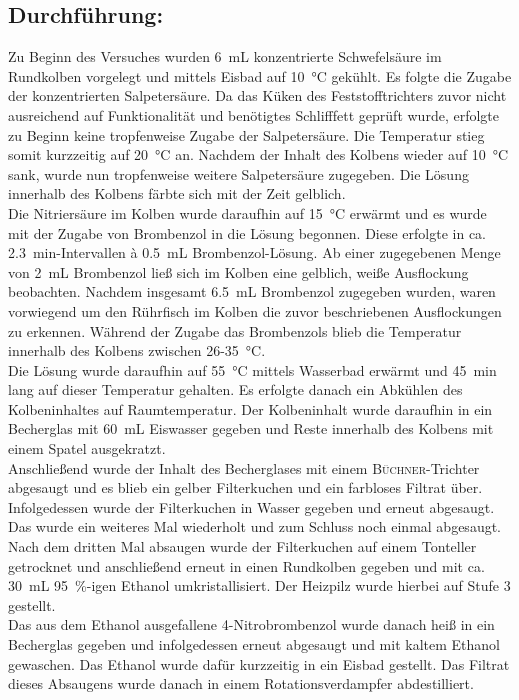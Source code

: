 \subsection*{Durchführung:}
Zu Beginn des Versuches wurden \SI{6}{\milli \liter} konzentrierte Schwefelsäure im Rundkolben vorgelegt und mittels Eisbad auf \SI{10}{\celsius} gekühlt. Es folgte die Zugabe der konzentrierten Salpetersäure. Da das Küken des Feststofftrichters zuvor nicht ausreichend auf Funktionalität und benötigtes Schlifffett geprüft wurde, erfolgte zu Beginn keine tropfenweise Zugabe der Salpetersäure. Die Temperatur stieg somit kurzzeitig auf \SI{20}{\celsius} an. Nachdem der Inhalt des Kolbens wieder auf \SI{10}{\celsius} sank, wurde nun tropfenweise weitere Salpetersäure zugegeben. Die Lösung innerhalb des Kolbens färbte sich mit der Zeit gelblich. \\
Die Nitriersäure im Kolben wurde daraufhin auf \SI{15}{\celsius} erwärmt und es wurde mit der Zugabe von Brombenzol in die Lösung begonnen. Diese erfolgte in ca. \SI{2,3}{\minute}-Intervallen à \SI{0,5}{\milli \liter} Brombenzol-Lösung. Ab einer zugegebenen Menge von \SI{2}{\milli \liter} Brombenzol ließ sich im Kolben eine gelblich, weiße Ausflockung beobachten. Nachdem insgesamt \SI{6,5}{\milli \liter} Brombenzol zugegeben wurden, waren vorwiegend um den Rührfisch im Kolben die zuvor beschriebenen Ausflockungen zu erkennen. Während der Zugabe das Brombenzols blieb die Temperatur innerhalb des Kolbens zwischen 26-\SI{35}{\celsius}.\\
Die Lösung wurde daraufhin auf \SI{55}{\celsius}  mittels Wasserbad erwärmt und \SI{45}{\minute} lang auf dieser Temperatur gehalten. Es erfolgte danach ein Abkühlen des Kolbeninhaltes auf Raumtemperatur. Der Kolbeninhalt wurde daraufhin in ein Becherglas mit \SI{60}{\milli \liter} Eiswasser gegeben und Reste innerhalb des Kolbens mit einem Spatel ausgekratzt.\\
\newpage
Anschließend wurde der Inhalt des Becherglases mit einem \textsc{Büchner}-Trichter abgesaugt und es blieb ein gelber Filterkuchen und ein farbloses Filtrat über. Infolgedessen wurde der Filterkuchen in Wasser gegeben und erneut abgesaugt. Das wurde ein weiteres Mal wiederholt und zum Schluss noch einmal abgesaugt. Nach dem dritten Mal absaugen wurde der Filterkuchen auf einem Tonteller getrocknet und anschließend erneut in einen Rundkolben gegeben und mit ca. \SI{30}{\milli \liter}  \SI{95}{\percent}-igen Ethanol umkristallisiert. Der Heizpilz wurde hierbei auf Stufe 3 gestellt.\\
Das aus dem Ethanol ausgefallene 4-Nitrobrombenzol wurde danach heiß in ein Becherglas gegeben und infolgedessen erneut abgesaugt und mit kaltem Ethanol gewaschen. Das Ethanol wurde dafür kurzzeitig in ein Eisbad gestellt. Das Filtrat dieses Absaugens wurde danach in einem Rotationsverdampfer abdestilliert.

